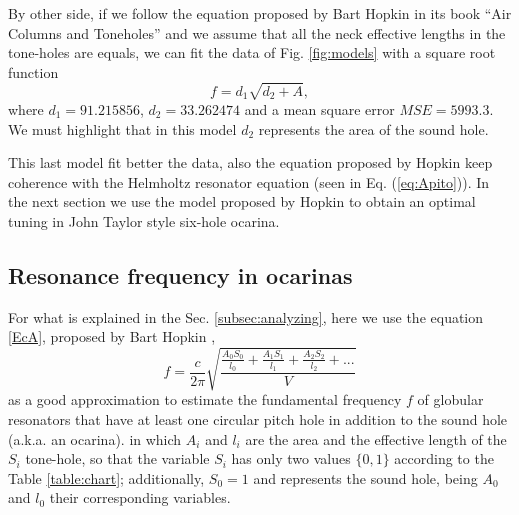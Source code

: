 \documentclass[11pt,twocolumn]{article}
\begin{document}
By other side, 
if we follow the equation proposed by Bart Hopkin in its book ``Air Columns and Toneholes'' 
\citep[pp. 44]{cabreraestudio} \citep[pp. 16]{1999air} and we assume that all the neck effective lengths in the tone-holes are equals,
we can fit the data of Fig. \ref{fig:models} with a square root function
\begin{equation}
f=d_1\sqrt{d_2+A},
\end{equation}
where $d_1=91.215856$, $d_2=33.262474$ and a mean square error $MSE=5993.3$.
We must highlight that in this model $d_2$ represents the area of the sound hole. 

This last model fit better the data, 
also the equation proposed by Hopkin keep coherence with the Helmholtz resonator equation (seen in Eq. (\ref{eq:Apito})).
In the next section we use the model proposed by Hopkin to obtain an optimal tuning in 
John Taylor style six-hole ocarina.


\subsection{Resonance frequency in ocarinas}
\label{subsec:Resonance}
For what is explained in the Sec. \ref{subsec:analyzing}, here 
we use the equation \ref{EcA}, proposed by Bart Hopkin \citep[pp. 44]{cabreraestudio} \citep[pp. 16]{1999air},
\begin{equation} \label{EcA}
 f = \frac{c}{2 \pi} \sqrt{\frac{\frac{A_{0}S_{0}}{l_{0}}+\frac{A_{1}S_{1}}{l_{1}}+\frac{A_{2}S_{2}}{l_{2}}+ . . .}{V} }   
\end{equation}
as a good approximation to estimate the fundamental frequency $f$ 
of globular resonators that have at least one circular pitch hole in addition to the sound hole (a.k.a. an ocarina). 
in which $A_i$ and $l_i$ are the area and the effective length of the $S_i$ tone-hole, 
so that the variable $S_i$ has only two values $\{0,1\}$ according to the Table \ref{table:chart}; 
additionally, $S_0=1$ and represents the sound hole, being $A_0$ and $l_0$ their corresponding variables. 
\end{document}
